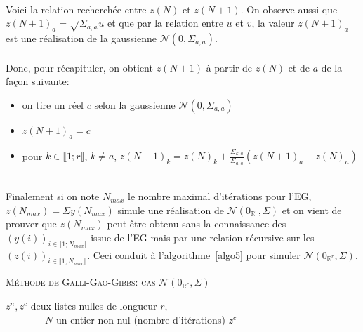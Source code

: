 ~\\

Voici la relation recherchée entre $z(N)$ et $z(N+1)$. On observe aussi que $z(N+1)_a = \sqrt{\Sigma_{a,a}} u$ et que par la relation entre $u$ et $v$, la valeur $z(N+1)_a$
est une réalisation de la gaussienne $\mathcal{N}(0,\Sigma_{a,a})$.\\
~\\
Donc, pour récapituler, on obtient $z(N+1)$ à partir de $z(N)$ et de $a$ de la façon suivante:
~\\
\begin{itemize}
\item on tire un réel $c$ selon la gaussienne $\mathcal{N}(0,\Sigma_{a,a})$
\item $z(N+1)_a = c$
\item pour $k \in \llbracket 1;r \rrbracket $, $k \neq a$, $z(N+1)_k = z(N)_k + \frac{\Sigma_{k,a}}{\Sigma_{a,a}} (z(N+1)_a - z(N)_a)$
\end{itemize}
~\\

Finalement si on note $N_{max}$ le nombre maximal d'itérations pour l'EG, $z(N_{max})=\Sigma y(N_{max})$ simule une réalisation de $\mathcal{N}(0_{\mathbb{R}^{r}},\Sigma)$
et on vient de prouver que $z(N_{max})$ peut être obtenu sans la connaissance des $(y(i))_{i \in \llbracket 1;N_{max}\rrbracket}$ issue de l'EG mais par une relation récursive sur les
$(z(i))_{i \in \llbracket 1;N_{max}\rrbracket}$. Ceci conduit à l'algorithme~\ref{algo5} pour simuler $\mathcal{N}(0_{\mathbb{R}^{r}},\Sigma)$.
\newpage
\begin{algorithm}[h]
\caption{\textsc{Méthode de Galli-Gao-Gibbs: cas $\mathcal{N}(0_{\mathbb{R}^{r}},\Sigma)$}}
\label{algo5}
\begin{algorithmic}
\REQUIRE $z^n, z^c$ deux listes nulles de longueur $r$, \\ $\qquad \qquad N$ un entier non nul (nombre d'itérations)
\BEGIN 
{}  
  \ENDFOR
\ENDFOR
\END
\ENSURE $z^c$ \\
\end{algorithmic}
\end{algorithm}

